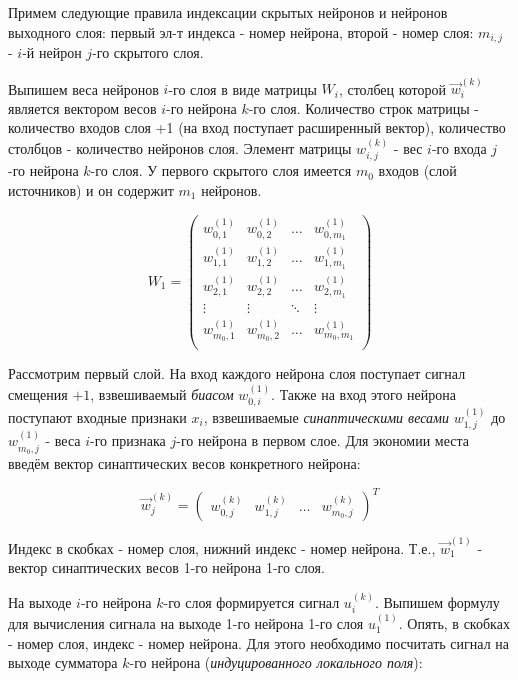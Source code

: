 \documentclass{article}
\numberwithin{equation}{subsection}
\begin{document}
Примем следующие правила индексации скрытых нейронов и нейронов выходного слоя:
первый эл-т индекса - номер нейрона, второй - номер слоя: 
$m_{i,j}$  - $i$-й нейрон $j$-го скрытого слоя.

Выпишем веса нейронов $i$-го слоя в виде матрицы $W_i$, столбец которой 
$\vec{w}_i^{(k)}$ является вектором весов $i$-го нейрона $k$-го слоя.
Количество строк матрицы - количество входов слоя \glqq +1\grqq 
(на вход поступает расширенный вектор), количество столбцов - количество нейронов слоя.
Элемент матрицы $w_{i,j}^{(k)}$ - вес $i$-го входа $j$-го нейрона $k$-го слоя.
У первого скрытого слоя имеется $m_0$ входов (слой источников) 
и он содержит $m_1$ нейронов.

\begin{equation}
    W_1 = 
    \begin{pmatrix}
        w_{0,1}^{(1)} & w_{0,2}^{(1)} & \dots & w_{0,{m_1}}^{(1)} \\
        w_{1,1}^{(1)} & w_{1,2}^{(1)} & \dots & w_{1,{m_1}}^{(1)} \\
        w_{2,1}^{(1)} & w_{2,2}^{(1)} & \dots & w_{2,{m_1}}^{(1)} \\
        \vdots        & \vdots        & \ddots & \vdots           \\
        w_{{m_0},1}^{(1)} & w_{{m_0},2}^{(1)} & \dots & w_{{m_0},{m_1}}^{(1)} \\
    \end{pmatrix}
\end{equation}

Рассмотрим первый слой.
На вход каждого нейрона слоя поступает сигнал смещения $+1$, взвешиваемый 
\textit{биасом} $w_{0,i}^{(1)}$. 
Также на вход этого нейрона поступают входные признаки $x_i$, взвешиваемые 
\textit{синаптическими весами} $w_{1,j}^{(1)}$ до $w_{{m_0},j}^{(1)}$ - веса $i$-го признака $j$-го нейрона в первом слое.   
Для экономии места введём вектор синаптических весов конкретного нейрона:

\begin{equation}
    \vec{w}_j^{(k)} = 
    \begin{pmatrix}
        w_{0,j}^{(k)} & w_{1,j}^{(k)} & \dots & w_{{m_0},j}^{(k)}
    \end{pmatrix}
    ^T
\end{equation}


Индекс в скобках - номер слоя, нижний индекс - номер нейрона. Т.е., $\vec{w}_1^{(1)}$ - вектор синаптических весов 1-го нейрона 1-го слоя.

На выходе $i$-го нейрона $k$-го слоя формируется сигнал $u_i^{(k)}$. 
Выпишем формулу для вычисления сигнала на выходе 1-го нейрона 1-го слоя $u_1^{(1)}$. Опять, в скобках - номер слоя, индекс - номер нейрона.
Для этого необходимо посчитать сигнал на выходе сумматора $k$-го нейрона (\textit{индуцированного локального поля}):
\end{document}
